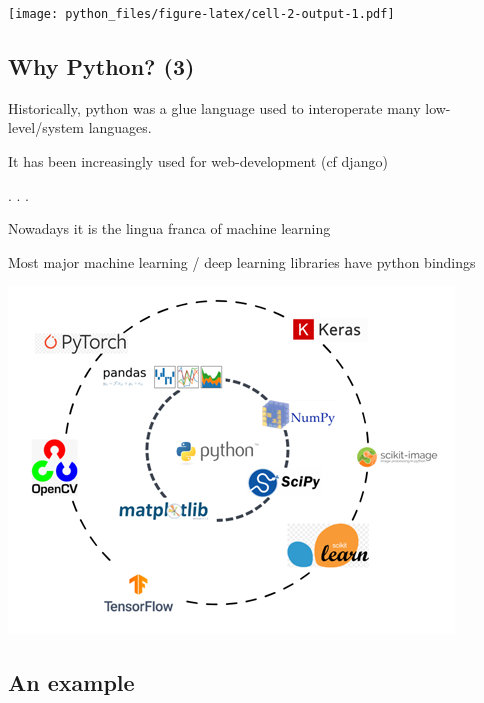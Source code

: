\documentclass[
  letterpaper,
  DIV=11,
  numbers=noendperiod]{scrartcl}
\begin{document}
\texttt{[image: python\_files/figure-latex/cell-2-output-1.pdf]}

\subsection{Why Python? (3)}\label{why-python-3}

Historically, python was a glue language used to interoperate many
low-level/system languages.

It has been increasingly used for web-development (cf django)

. . .

Nowadays it is the lingua franca of machine learning

Most major machine learning / deep learning libraries have python
bindings

\includegraphics{graphs/python_ml.png}

\subsection{An example}\label{an-example}
\end{document}

